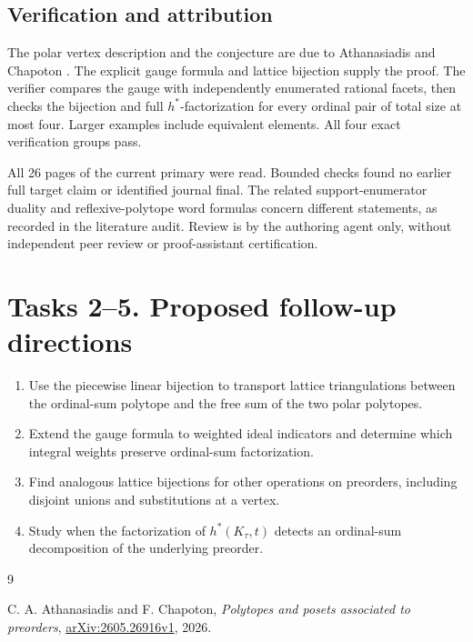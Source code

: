 \documentclass[11pt]{article}
\begin{document}
\subsection*{Verification and attribution}
The polar vertex description and the conjecture are due to
Athanasiadis and Chapoton \cite{AC}. The explicit gauge formula
and lattice bijection supply the proof. The verifier compares the
gauge with independently enumerated rational facets, then checks
the bijection and full $h^*$-factorization for every ordinal pair
of total size at most four. Larger examples include equivalent
elements. All four exact verification groups pass.

All 26 pages of the current primary were read. Bounded checks
found no earlier full target claim or identified journal final.
The related support-enumerator duality and reflexive-polytope
word formulas concern different statements, as recorded in the
literature audit. Review is by the authoring agent only, without
independent peer review or proof-assistant certification.

\section*{Tasks 2--5. Proposed follow-up directions}
\begin{enumerate}[label=\textbf{Task \arabic*.},start=2,leftmargin=*]
\item Use the piecewise linear bijection to transport lattice
triangulations between the ordinal-sum polytope and the free sum
of the two polar polytopes.
\item Extend the gauge formula to weighted ideal indicators and
determine which integral weights preserve ordinal-sum factorization.
\item Find analogous lattice bijections for other operations on
preorders, including disjoint unions and substitutions at a vertex.
\item Study when the factorization of $h^*(K_\tau,t)$ detects
an ordinal-sum decomposition of the underlying preorder.
\end{enumerate}
\begin{thebibliography}{9}
\raggedright
{} C. A. Athanasiadis and F. Chapoton,
\emph{Polytopes and posets associated to preorders},
\href{https://arxiv.org/abs/2605.26916v1}{arXiv:2605.26916v1}, 2026.
\end{thebibliography}
\end{document}
